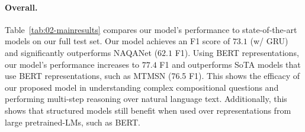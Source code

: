\documentclass[main.tex]{subfiles}
\begin{document}
\paragraph{Overall.} Table~\ref{tab:02-mainresults} compares our model's performance to state-of-the-art models on our full test set.
Our model achieves an F1 score of $73.1$ (w/ GRU) and significantly outperforms NAQANet ($62.1$ F1).
Using BERT representations, our model's performance increases to $77.4$ F1 and outperforms SoTA models that use BERT representations, such as MTMSN (76.5 F1).
This shows the efficacy of our proposed model in understanding complex compositional questions and performing multi-step reasoning over natural language text. Additionally, this shows that structured models still benefit when used over representations from large pretrained-LMs, such as BERT.
\end{document}
